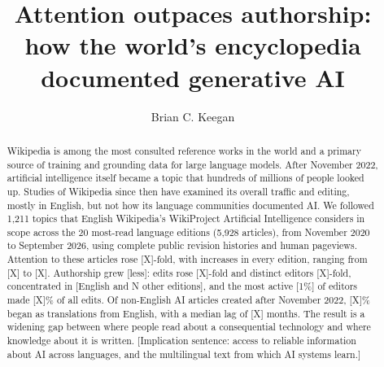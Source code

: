 \documentclass[9pt,twocolumn,twoside]{pnas-new}
\begin{document}
\title{Attention outpaces authorship: how the world's encyclopedia documented generative AI}

\author[a,1]{Brian C. Keegan}





\begin{abstract}
Wikipedia is among the most consulted reference works in the world and a primary source of training and grounding data for large language models. After November 2022, artificial intelligence itself became a topic that hundreds of millions of people looked up. Studies of Wikipedia since then have examined its overall traffic and editing, mostly in English, but not how its language communities documented AI. We followed 1,211 topics that English Wikipedia's WikiProject Artificial Intelligence considers in scope across the 20 most-read language editions (5,928 articles), from November 2020 to September 2026, using complete public revision histories and human pageviews. Attention to these articles rose [X]-fold, with increases in every edition, ranging from [X] to [X]. Authorship grew [less]: edits rose [X]-fold and distinct editors [X]-fold, concentrated in [English and N other editions], and the most active [1\%] of editors made [X]\% of all edits. Of non-English AI articles created after November 2022, [X]\% began as translations from English, with a median lag of [X] months. The result is a widening gap between where people read about a consequential technology and where knowledge about it is written. [Implication sentence: access to reliable information about AI across languages, and the multilingual text from which AI systems learn.]
\end{abstract}
\end{document}
